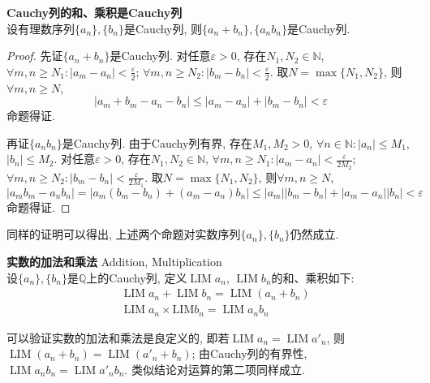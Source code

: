 \begin{pro} \textbf{Cauchy列的和、乘积是Cauchy列} \\
设有理数序列$\{a_n\},\{b_n\}$是Cauchy列, 则$\{a_n+b_n\}, \{a_nb_n\}$是Cauchy列.
\end{pro}
\begin{proof}
先证$\{a_n+b_n\}$是Cauchy列. 对任意$\varepsilon>0$, 存在$N_1, N_2\in \mathbb{N}$, $\forall m,n\ge N_1: |a_m-a_n|<\frac{\varepsilon}{2}$; $\forall m,n\ge N_2: |b_m-b_n|<\frac{\varepsilon}{2}$. 取$N=\max \{N_1,N_2\}$, 则$\forall m,n\ge N$, 
\begin{equation}
    |a_m+b_m-a_n-b_n|\le |a_m-a_n|+|b_m-b_n|<\varepsilon
\end{equation}
命题得证. 
\par 再证$\{a_nb_n\}$是Cauchy列. 由于Cauchy列有界, 存在$M_1, M_2>0$, $\forall n\in \mathbb{N}: |a_n|\le M_1$, $|b_n|\le M_2$. 对任意$\varepsilon>0$, 存在$N_1, N_2\in \mathbb{N}$, $\forall m,n\ge N_1: |a_m-a_n|<\frac{\varepsilon}{2M_2}$; $\forall m,n\ge N_2: |b_m-b_n|<\frac{\varepsilon}{2M_1}$. 取$N=\max \{N_1,N_2\}$, 则$\forall m,n\ge N$,
\begin{equation}
    |a_mb_m-a_nb_n|=|a_m(b_m-b_n)+(a_m-a_n)b_n|\le |a_m||b_m-b_n|+|a_m-a_n||b_n| < \varepsilon
\end{equation}
命题得证. 
\end{proof}
同样的证明可以得出, 上述两个命题对实数序列$\{a_n\}, \{b_n\}$仍然成立. 

\begin{dfn} \textbf{实数的加法和乘法} Addition, Multiplication\\
设$\{a_n\},\{b_n\}$是$\mathbb{Q}$上的Cauchy列, 定义$\operatorname{LIM} a_n$, $\operatorname{LIM} b_n$的和、乘积如下:
\begin{align}
&\operatorname{LIM} a_n + \operatorname{LIM} b_n=\operatorname{LIM} (a_n+b_n)\\
&\operatorname{LIM} a_n \times \mathrm{LIM} b_n=\operatorname{LIM} a_nb_n
\end{align}
\end{dfn}
可以验证实数的加法和乘法是良定义的, 即若$\operatorname{LIM} a_n = \operatorname{LIM} a'_n$, 则$\operatorname{LIM} (a_n+b_n) = \operatorname{LIM} (a'_n+b_n) $; 由Cauchy列的有界性, $\operatorname{LIM} a_nb_n = \operatorname{LIM} a'_nb_n$. 类似结论对运算的第二项同样成立.

